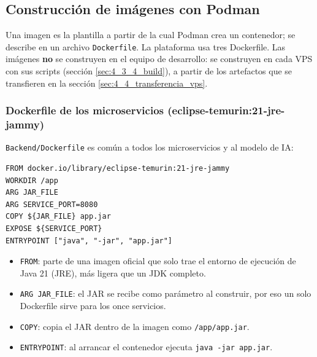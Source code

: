 \subsection{Construcción de imágenes con Podman}\label{sec:4_3_construccion_imagenes}
Una imagen es la plantilla a partir de la cual Podman crea un contenedor; se describe en un archivo \texttt{Dockerfile}. La plataforma usa tres Dockerfile. Las imágenes \textbf{no} se construyen en el equipo de desarrollo: se construyen en cada VPS con sus scripts (sección \ref{sec:4_3_4_build}), a partir de los artefactos que se transfieren en la sección \ref{sec:4_4_transferencia_vps}.

\subsubsection{Dockerfile de los microservicios (eclipse-temurin:21-jre-jammy)}
\texttt{Backend/Dockerfile} es común a todos los microservicios y al modelo de IA:
\begin{lstlisting}
FROM docker.io/library/eclipse-temurin:21-jre-jammy
WORKDIR /app
ARG JAR_FILE
ARG SERVICE_PORT=8080
COPY ${JAR_FILE} app.jar
EXPOSE ${SERVICE_PORT}
ENTRYPOINT ["java", "-jar", "app.jar"]
\end{lstlisting}
\begin{itemize}
  \item \texttt{FROM}: parte de una imagen oficial que solo trae el entorno de ejecución de Java 21 (JRE), más ligera que un JDK completo.
  \item \texttt{ARG JAR\_FILE}: el JAR se recibe como parámetro al construir, por eso un solo Dockerfile sirve para los once servicios.
  \item \texttt{COPY}: copia el JAR dentro de la imagen como \texttt{/app/app.jar}.
  \item \texttt{ENTRYPOINT}: al arrancar el contenedor ejecuta \texttt{java -jar app.jar}.
\end{itemize}

